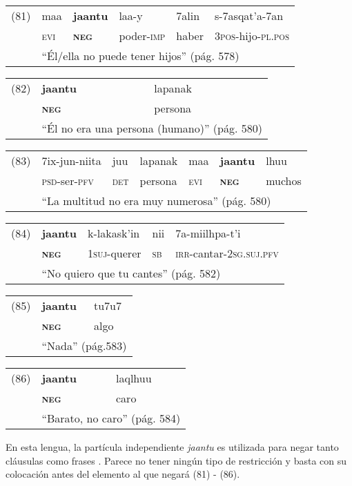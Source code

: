{\setmainfont{Charis SIL} 

\begin{tabular}{llllll}
(81) & maa & \textbf{jaantu} & laa-y & 7alin & s-7asqat'a-7an \\
& \textsc{evi} & \textsc{\textbf{neg}} & poder-\textsc{imp} & haber & \textsc{3pos}-hijo-\textsc{pl.pos} \\
& \multicolumn{5}{l}{``Él/ella no puede tener hijos'' (pág. 578)}
\end{tabular} \vspace{0.5cm}

\begin{tabular}{lll}
(82) & \textbf{jaantu} & lapanak \\
& \textsc{\textbf{neg}} & persona \\
& \multicolumn{2}{l}{``Él no era una persona (humano)'' (pág. 580)}
\end{tabular} \vspace{0.5cm}

\begin{tabular}{lllllll}
(83) & 7ix-jun-niita & juu & lapanak & maa & \textbf{jaantu} & lhuu \\
& \textsc{psd}-ser-\textsc{pfv} & \textsc{det} & persona & \textsc{evi} & \textsc{\textbf{neg}} & muchos \\
& \multicolumn{6}{l}{``La multitud no era muy numerosa'' (pág. 580)}
\end{tabular} \vspace{0.5cm}

\begin{tabular}{lllll}
(84) & \textbf{jaantu} & k-lakask'in & nii & 7a-miilhpa-t'i \\
& \textsc{\textbf{neg}} & \textsc{1suj}-querer & \textsc{sb} & \textsc{irr}-cantar-\textsc{2sg.suj.pfv}\\
& \multicolumn{4}{l}{``No quiero que tu cantes'' (pág. 582)}
\end{tabular} \vspace{0.5cm}

\begin{tabular}{lll}
(85) & \textbf{jaantu} & tu7u7 \\
& \textsc{\textbf{neg}} & algo \\
& \multicolumn{2}{l}{``Nada'' (pág.583)}
\end{tabular} \vspace{0.5cm}

\begin{tabular}{lll}
(86) & \textbf{jaantu} & laqlhuu \\
& \textsc{\textbf{neg}} & caro \\
& \multicolumn{2}{l}{``Barato, no caro'' (pág. 584)}
\end{tabular} \vspace{0.5cm}

}

En esta lengua, la partícula independiente {\setmainfont{Charis SIL} \textit{jaantu}} es utilizada para negar tanto cláusulas como frases \textcolor{MidnightBlue}{\citep{Tepehua}}. Parece no tener ningún tipo de restricción y basta con su colocación antes del elemento al que negará (81) - (86).